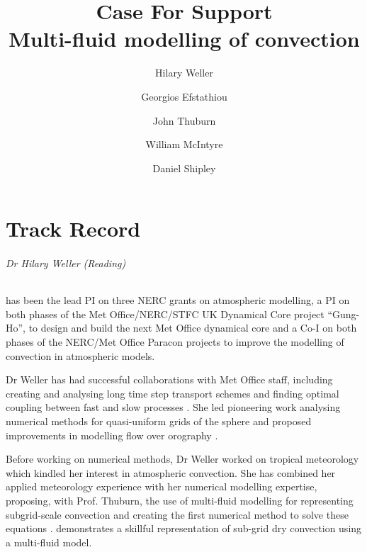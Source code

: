 \documentclass[11pt,a4paper]{article}
\begin{document}
\title{Case For Support \\ \Large
Multi-fluid modelling of convection
}
\author{Hilary Weller \and Georgios Efstathiou \and John Thuburn \and William McIntyre \and Daniel Shipley}
\date{}
\maketitle

\part{Track Record}

\paragraph*{Dr Hilary Weller (Reading)} has been the lead PI on three NERC grants on atmospheric modelling, a PI on both phases of the Met Office/NERC/STFC UK Dynamical Core project ``Gung-Ho'', to design and build the next Met Office dynamical core and a Co-I on both phases of the NERC/Met Office Paracon projects to improve the modelling of convection in atmospheric models.

Dr Weller has had successful collaborations with Met Office staff, including creating and analysing long time step transport schemes \cite[]{CWPS17,SWMD17} and finding optimal coupling between fast and slow processes \cite[][]{WLW13}. She led pioneering work analysing numerical methods for quasi-uniform grids of the sphere \cite[e.g.][]{WWF09,Wel12,WTC12} and proposed improvements in modelling flow over orography \cite[]{WS14}. 

Before working on numerical methods, Dr Weller worked on tropical meteorology \cite[e.g.][]{LGWS09} which kindled her interest in atmospheric convection. She has combined her applied meteorology experience with her numerical modelling expertise, proposing, with Prof. Thuburn, the use of multi-fluid modelling for representing subgrid-scale convection \cite[]{TWV+18} and creating the first numerical method to solve these equations \cite[]{WM19}. \cite{WMS20} demonstrates a skillful representation of sub-grid dry convection using a multi-fluid model.
\end{document}
